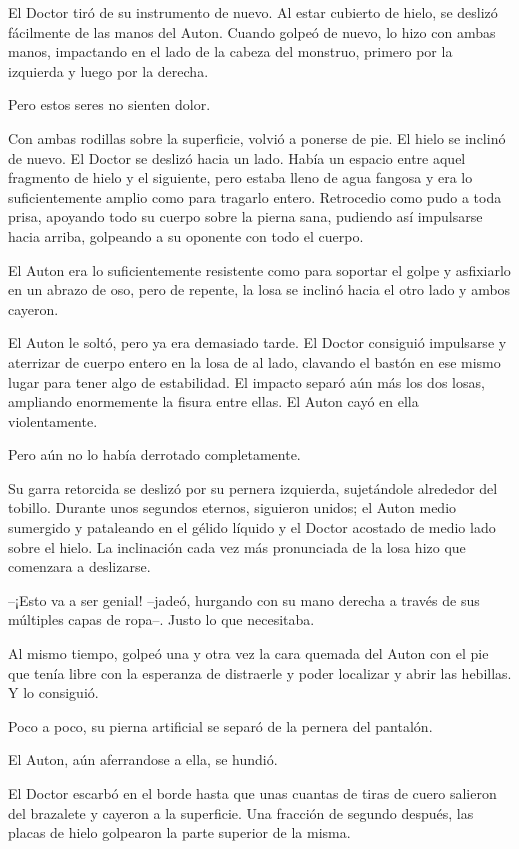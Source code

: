 El Doctor tiró de su instrumento de nuevo. Al estar cubierto de hielo, se deslizó fácilmente de las manos del Auton. Cuando golpeó de nuevo, lo hizo con ambas manos, impactando en el lado de la cabeza del monstruo, primero por la izquierda y luego por la derecha.
 
Pero estos seres no sienten dolor.
 
Con ambas rodillas sobre la superficie, volvió a ponerse de pie. El hielo se inclinó de nuevo. El Doctor se deslizó hacia un lado. Había un espacio entre aquel fragmento de hielo y el siguiente, pero estaba lleno de agua fangosa y era lo suficientemente amplio como para tragarlo entero. Retrocedio como pudo a toda prisa, apoyando todo su cuerpo sobre la pierna sana, pudiendo así impulsarse hacia arriba, golpeando a su oponente con todo el cuerpo.
 
El Auton era lo suficientemente resistente como para soportar el golpe y asfixiarlo en un abrazo de oso, pero de repente, la losa se inclinó hacia el otro lado y ambos cayeron.
 
El Auton le soltó, pero ya era demasiado tarde. El Doctor consiguió impulsarse y aterrizar de cuerpo entero en la losa de al lado, clavando el bastón en ese mismo lugar para tener algo de estabilidad. El impacto separó aún más los dos losas, ampliando enormemente la fisura entre ellas. El Auton cayó en ella violentamente.
 
Pero aún no lo había derrotado completamente.
 
Su garra retorcida se deslizó por su pernera izquierda, sujetándole alrededor del tobillo. Durante unos segundos eternos, siguieron unidos; el Auton medio sumergido y pataleando en el gélido líquido y el Doctor acostado de medio lado sobre el hielo. La inclinación cada vez más pronunciada de la losa hizo que comenzara a deslizarse.
 
--¡Esto va a ser genial! --jadeó, hurgando con su mano derecha a través de sus múltiples capas de ropa--. Justo lo que necesitaba.
 
Al mismo tiempo, golpeó una y otra vez la cara quemada del Auton con el pie que tenía libre con la esperanza de distraerle y poder localizar y abrir las hebillas. Y lo consiguió.
 
Poco a poco, su pierna artificial se separó de la pernera del pantalón.
 
El Auton, aún aferrandose a ella, se hundió.
 
El Doctor escarbó en el borde hasta que unas cuantas de tiras de cuero salieron del brazalete y cayeron a la superficie. Una fracción de segundo después, las placas de hielo golpearon la parte superior de la misma.
 
